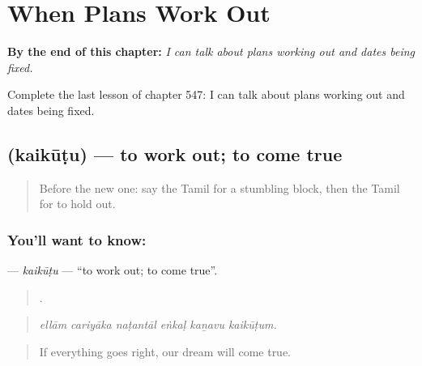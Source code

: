 
\chapter{When Plans Work Out}
\label{ch:ta-when-plans-work-out}

\begin{chapteropening}
\textbf{By the end of this chapter:} \emph{I can talk about plans working out and dates being fixed.}

Complete the last lesson of chapter 547: I can talk about plans working out and dates being fixed.
\end{chapteropening}

\section[\texorpdfstring{\ta{கைகூடு} (kaikūṭu)}{கைகூடு (kaikūṭu)}]{ (kaikūṭu) — to work out; to come true}

\label{lesson:TA-C547-kaikutu}



\begin{quote}
Before the new one: say the Tamil for a stumbling block, then the Tamil for to hold out.
\end{quote}

\subsection*{You'll want to know: }
\textbf{} — \emph{kaikūṭu} — \textquotedblleft{}to work out; to come true\textquotedblright{}.

\begin{quote}
     .
\end{quote}

\begin{quote}
\emph{ellām cariyāka naṭantāl eṅkaḷ kaṉavu kaikūṭum.}
\end{quote}

\begin{quote}
If everything goes right, our dream will come true.
\end{quote}

